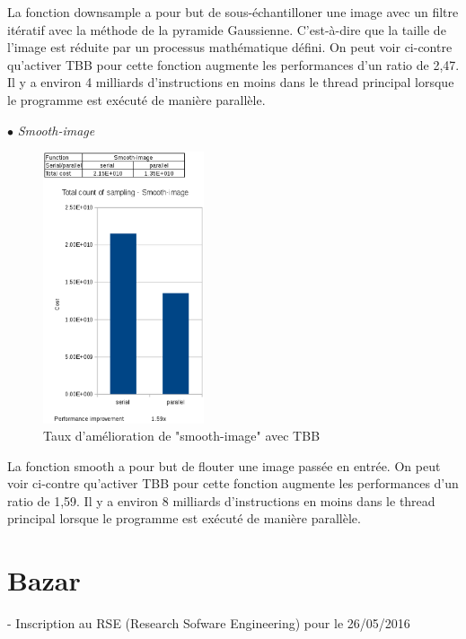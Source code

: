 \documentclass{report}
\begin{document}
La fonction downsample a pour but de sous-échantilloner une image avec un filtre itératif avec la méthode de la pyramide Gaussienne. C'est-à-dire que la taille de l'image est réduite par un processus mathématique défini.\newline
On peut voir ci-contre qu'activer TBB pour cette fonction augmente les performances d'un ratio de 2,47. Il y a environ 4 milliards d'instructions en moins dans le thread principal lorsque le programme est exécuté de manière parallèle. \newline\newline\newline\newline\newline\newline\newline\newline\newline\newline\newline\newline\newline\newline\newline\newline



{$\bullet$} \textit{Smooth-image} \newline
\begin{figure}
	
	\includegraphics[height=8cm]{figures/smooth_image_costs.eps}
	\caption{Taux d'amélioration de "smooth-image" avec TBB}
	\label{Taux d'amélioration de "smotth-image" avec TBB}
\end{figure}
La fonction smooth a pour but de flouter une image passée en entrée. \newline
On peut voir ci-contre qu'activer TBB pour cette fonction augmente les performances d'un ratio de 1,59. Il y a environ 8 milliards d'instructions en moins dans le thread principal lorsque le programme est exécuté de manière parallèle.
\chapter*{Bazar}
- Inscription au RSE (Research Sofware Engineering) pour le 26/05/2016
\end{document}
